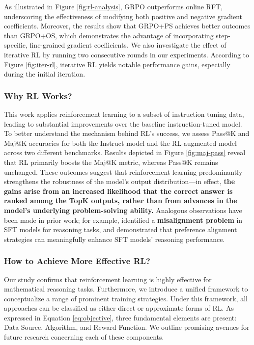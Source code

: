 As illustrated in Figure \ref{fig:rl-analysis}, GRPO outperforms online RFT, underscoring the effectiveness of modifying both positive and negative gradient coefficients. Moreover, the results show that GRPO+PS achieves better outcomes than GRPO+OS, which demonstrates the advantage of incorporating step-specific, fine-grained gradient coefficients. We also investigate the effect of iterative RL by running two consecutive rounds in our experiments. According to Figure \ref{fig:iter-rl}, iterative RL yields notable performance gains, especially during the initial iteration.

\subsubsection{Why RL Works?} This work applies reinforcement learning to a subset of instruction tuning data, leading to substantial improvements over the baseline instruction-tuned model. To better understand the mechanism behind RL's success, we assess Pass@K and Maj@K accuracies for both the Instruct model and the RL-augmented model across two different benchmarks. Results depicted in Figure \ref{fig:maj-pass} reveal that RL primarily boosts the Maj@K metric, whereas Pass@K remains unchanged. These outcomes suggest that reinforcement learning predominantly strengthens the robustness of the model's output distribution—in effect, \textbf{the gains arise from an increased likelihood that the correct answer is ranked among the TopK outputs, rather than from advances in the model's underlying problem-solving ability.} Analogous observations have been made in prior work; for example, \citep{wang2023making} identified a \textbf{misalignment problem} in SFT models for reasoning tasks, and demonstrated that preference alignment strategies \citep{yuan2023rrhf,song2023preference,wang2023making} can meaningfully enhance SFT models’ reasoning performance.

\subsubsection{How to Achieve More Effective RL?}
\label{sec:effec_rl}
Our study confirms that reinforcement learning is highly effective for mathematical reasoning tasks. Furthermore, we introduce a unified framework to conceptualize a range of prominent training strategies. Under this framework, all approaches can be classified as either direct or approximate forms of RL. As expressed in Equation \ref{eq:objective}, three fundamental elements are present: Data Source, Algorithm, and Reward Function. We outline promising avenues for future research concerning each of these components.

